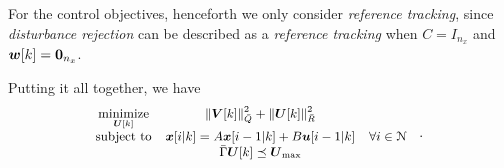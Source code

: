 \documentclass[../main.tex]{subfiles}
\begin{document}
For the control objectives, henceforth we only consider \emph{reference tracking}, since \emph{disturbance rejection} can be described as a \emph{reference tracking} when ${ C=I_{n_{x}} }$ and ${ \boldsymbol{w}[k]=\mathbf{0}_{n_{x}} }$.

Putting it all together, we have
\begin{equation}
  \small
  \begin{aligned}
    \begin{matrix}
      \mathop{\textrm{minimize}}\limits_{\boldsymbol{U}[k]} &\left\lVert\boldsymbol{V}[k]\right\rVert^{2}_{\bar{Q}} + \left\lVert\boldsymbol{U}[k] \right\rVert^{2}_{\bar{R}}&\\
      \mathrm{subject~ to} &
      \boldsymbol{x}[i|k]=A\boldsymbol{x}[i-1|k]+B\boldsymbol{u}[i-1|k]
      &
       \forall i\in\mathcal{N} \\
      &\bar{\Gamma}\boldsymbol{U}[k]\preceq {\boldsymbol{U}}_{\text{max}}&

    \end{matrix}
  \end{aligned}
  \label{eq:general_qp}
  \quad.
\end{equation}
\end{document}
